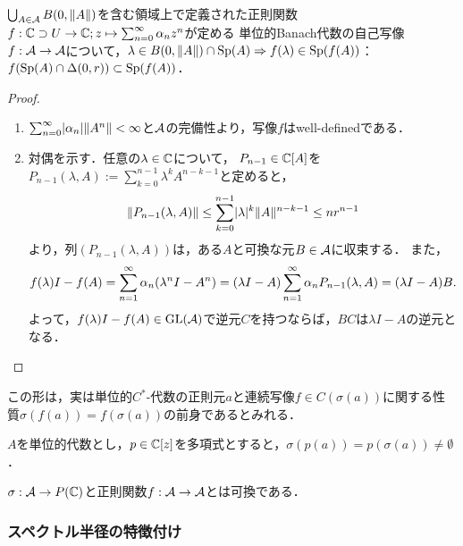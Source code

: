 \documentclass[uplatex,dvipdfmx]{jsreport}
\begin{document}
\begin{lemma}
    $\bigcup_{A\in\mathcal{A}}B(0,\|A\|)$を含む領域上で定義された正則関数$f:\mathbb{C}\supset U\to\mathbb{C};z\mapsto\sum_{n=0}^\infty\alpha_nz^n$が定める
    単位的Banach代数の自己写像$f:\mathcal{A}\to\mathcal{A}$について，$\lambda\in B(0,\|A\|)\cap\mathrm{Sp}(A)\Rightarrow f(\lambda)\in\mathrm{Sp}(f(A))$：$f(\mathrm{Sp}(A)\cap \Delta(0,r))\subset\mathrm{Sp}(f(A))$．
\end{lemma}
\begin{proof}\mbox{}
    \begin{enumerate}
        \item $\sum_{n=0}^\infty\lvert\alpha_n\rvert\|A^n\|<\infty$と$\mathcal{A}$の完備性より，写像$f$はwell-definedである．
        \item 対偶を示す．任意の$\lambda\in\mathbb{C}$について，
        $P_{n-1}\in\mathbb{C}[A]$を$P_{n-1}(\lambda,A):=\sum_{k=0}^{n-1}\lambda^kA^{n-k-1}$と定めると，
        \[\|P_{n-1}(\lambda,A)\|\le\sum^{n-1}_{k=0}\lvert\lambda\rvert^k\|A\|^{n-k-1}\le nr^{n-1}\]
        より，列$(P_{n-1}(\lambda,A))$は，ある$A$と可換な元$B\in\mathcal{A}$に収束する．
        また，
        \[f(\lambda)I-f(A)=\sum^\infty_{n=1}\alpha_n(\lambda^nI-A^n)=(\lambda I-A)\sum^\infty_{n=1}\alpha_nP_{n-1}(\lambda,A)=(\lambda I-A)B.\]
        よって，$f(\lambda)I-f(A)\in\mathrm{GL}(\mathcal{A})$で逆元$C$を持つならば，$BC$は$\lambda I-A$の逆元となる．
    \end{enumerate}
\end{proof}
\begin{remarks}
    この形は，実は単位的$C^*$-代数の正則元$a$と連続写像$f\in C(\sigma(a))$に関する性質$\sigma(f(a))=f(\sigma(a))$の前身であるとみれる．
\end{remarks}

\begin{theorem}[一般の代数に関するスペクトル写像定理]
    $A$を単位的代数とし，$p\in\mathbb{C}[z]$を多項式とすると，$\sigma(p(a))=p(\sigma(a))\ne\emptyset$．\cite{Murphy}
\end{theorem}
\begin{remarks}
    $\sigma:\mathcal{A}\to P(\mathbb{C})$と正則関数$f:\mathcal{A}\to\mathcal{A}$とは可換である．
\end{remarks}

\subsubsection{スペクトル半径の特徴付け}
\end{document}
